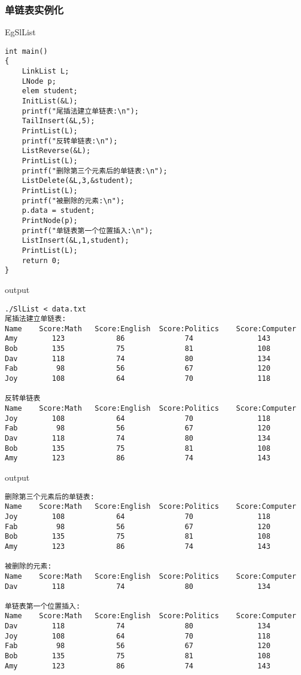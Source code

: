 \subsubsection{单链表实例化}
\begin{macbox}{EgSlList}
	\begin{verbatim}
int main()
{
    LinkList L;
    LNode p;
    elem student;
    InitList(&L);
    printf("尾插法建立单链表:\n");
    TailInsert(&L,5);
    PrintList(L);
    printf("反转单链表:\n");
    ListReverse(&L);
    PrintList(L);
    printf("删除第三个元素后的单链表:\n");
    ListDelete(&L,3,&student);
    PrintList(L);
    printf("被删除的元素:\n");
    p.data = student;
    PrintNode(p);
    printf("单链表第一个位置插入:\n");
    ListInsert(&L,1,student);
    PrintList(L);
    return 0;
}
    \end{verbatim}
\end{macbox}

\begin{macbox}{output}
    \begin{verbatim}
./SlList < data.txt
尾插法建立单链表:
Name    Score:Math   Score:English  Score:Politics    Score:Computer
Amy        123            86              74               143
Bob        135            75              81               108
Dav        118            74              80               134
Fab         98            56              67               120
Joy        108            64              70               118

反转单链表
Name    Score:Math   Score:English  Score:Politics    Score:Computer
Joy        108            64              70               118
Fab         98            56              67               120
Dav        118            74              80               134
Bob        135            75              81               108
Amy        123            86              74               143
    \end{verbatim}
\end{macbox}
\begin{macbox}{output}
    \begin{verbatim}
删除第三个元素后的单链表:
Name    Score:Math   Score:English  Score:Politics    Score:Computer
Joy        108            64              70               118
Fab         98            56              67               120
Bob        135            75              81               108
Amy        123            86              74               143

被删除的元素:
Name    Score:Math   Score:English  Score:Politics    Score:Computer
Dav        118            74              80               134

单链表第一个位置插入:
Name    Score:Math   Score:English  Score:Politics    Score:Computer
Dav        118            74              80               134
Joy        108            64              70               118
Fab         98            56              67               120
Bob        135            75              81               108
Amy        123            86              74               143
    \end{verbatim}
\end{macbox}
